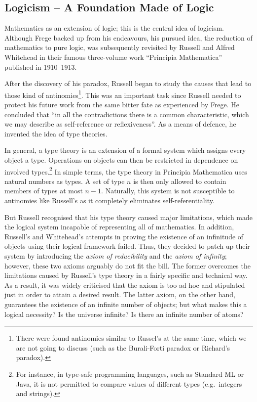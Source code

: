 \documentclass{article}
\begin{document}
\subsection{Logicism -- A Foundation Made of Logic}\label{ssec_logicism}
Mathematics as an extension of logic; this is the central idea of logicism. Although Frege backed up from his endeavours, his pursued idea, the reduction of mathematics to pure logic, was subsequently revisited by Russell and Alfred Whitehead in their famous three-volume work ``Principia Mathematica'' published in 1910--1913.

After the discovery of his paradox, Russell began to study the causes that lead to those kind of antinomies\footnote{There were found antinomies similar to Russel's at the same time, which we are not going to discuss (such as the Burali-Forti paradox or Richard's paradox).\cite[pp.~5--10]{fraenkel}}. This was an important task since Russell needed to protect his future work from the same bitter fate as experienced by Frege. He concluded that ``in all the contradictions there is a common characteristic, which we may describe as self-reference or reflexiveness''\cite[p. 224]{russell_self_referentiality}. As a means of defence, he invented the idea of type theories. 

In general, a type theory is an extension of a formal system which assigns every object a type. Operations on objects can then be restricted in dependence on involved types.\footnote{For instance, in type-safe programming languages, such as Standard ML or Java, it is not permitted to compare values of different types (e.g.\ integers and strings).} In simple terms, the type theory in Principia Mathematica uses natural numbers as types. A set of type $n$ is then only allowed to contain members of types at most $n-1$. Naturally, this system is not susceptible to antinomies like Russell's as it completely eliminates self-referentiality. 

But Russell recognised that his type theory caused major limitations, which made the logical system incapable of representing all of mathematics. In addition, Russell's and Whitehead's attempts in proving the existence of an infinitude of objects using their logical framework failed. Thus, they decided to patch up their system by introducing the \textit{axiom of reducibility} and the \textit{axiom of infinity}; however, these two axioms arguably do not fit the bill. The former overcomes the limitations caused by Russell's type theory in a fairly specific and technical way. As a result, it was widely criticised that the axiom is too ad hoc and stipulated just in order to attain a desired result.
The latter axiom, on the other hand, guarantees the existence of an infinite number of objects; but what makes this a logical necessity? Is the universe infinite? Is there an infinite number of atoms?
\end{document}
